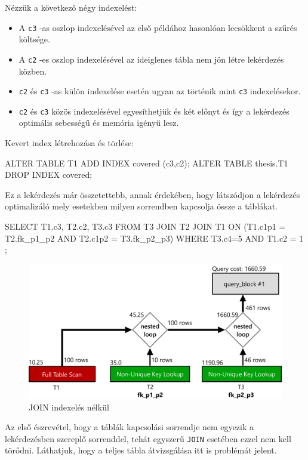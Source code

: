 Nézzük a következő négy indexelést:
\begin{itemize} 
\item A \texttt{c3} -as oszlop indexelésével az első példához hasonlóan lecsökkent a szűrés költsége.
\item A \texttt{c2} -es oszlop indexelésével az ideiglenes tábla nem jön létre lekérdezés közben.
\item \texttt{c2} és \texttt{c3} -as külön indexelése esetén ugyan az történik mint \texttt{c3} indexelésekor.
\item \texttt{c2} és \texttt{c3} közös indexelésével egyesíthetjük és két előnyt és így a lekérdezés optimális sebességű és memória igényű lesz.
\end{itemize} 
Kevert index létrehozása és törlése:
\begin{python}
ALTER TABLE T1 ADD INDEX covered (c3,c2);
ALTER TABLE thesis.T1 DROP INDEX covered;
\end{python}


Ez a lekérdezés már összetettebb, annak érdekében, hogy látszódjon a lekérdezés optimalizáló mely esetekben milyen sorrendben kapcsolja össze a táblákat.
\begin{python}
SELECT T1.c3, T2.c2, T3.c3 FROM T3 JOIN T2 JOIN T1 
	ON (T1.c1p1 = T2.fk_p1_p2 AND T2.c1p2 = T3.fk_p2_p3) 
	WHERE  T3.c4=5 AND T1.c2 = 1 ;
\end{python}

\begin{figure}[h!]
\centering
\includegraphics[width=14cm]{images/explain/3-1.png}
\caption{JOIN indexelés nélkül}
\label{fig:schema}
\end{figure}

Az első észrevétel, hogy a táblák kapcsolási sorrendje nem egyezik a lekérdezésben szereplő sorrenddel, tehát egyszerű \texttt{JOIN} esetében ezzel nem kell törődni. Láthatjuk, hogy a teljes tábla átvizsgálása itt is problémát jelent. 

